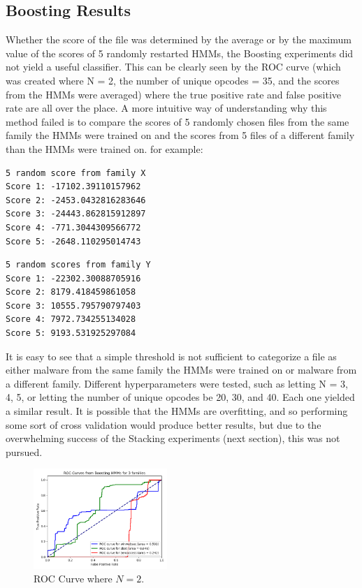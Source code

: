 \documentclass[12pt]{article}
\begin{document}
 \subsection{Boosting Results}
Whether the score of the file was determined by the average or by the maximum value of the scores of 5 randomly restarted HMMs, the Boosting experiments did not yield a useful classifier. This can be clearly seen by the ROC curve (which was created where N = 2, the number of unique opcodes = 35, and the scores from the HMMs were averaged) where the true positive rate and false positive rate are all over the place. A more intuitive way of understanding why this method failed is to compare the scores of 5 randomly chosen files from the same family the HMMs were trained on and the scores from 5 files of a different family than the HMMs were trained on. 
for example:
\begin{lstlisting}
5 random score from family X
Score 1: -17102.39110157962
Score 2: -2453.0432816283646
Score 3: -24443.862815912897
Score 4: -771.3044309566772
Score 5: -2648.110295014743
\end{lstlisting}
\begin{lstlisting}
5 random scores from family Y
Score 1: -22302.30088705916
Score 2: 8179.418459861058
Score 3: 10555.795790797403
Score 4: 7972.734255134028
Score 5: 9193.531925297084
\end{lstlisting}
It is easy to see that a simple threshold is not sufficient to categorize a file as either malware from the same family the HMMs were trained on or malware from a different family. Different hyperparameters were tested, such as letting N = 3, 4, 5, or letting the number of unique opcodes be 20, 30, and 40. Each one yielded a similar result. It is possible that the HMMs are overfitting, and so performing some sort of cross validation would produce better results, but due to the overwhelming success of the Stacking experiments (next section), this was not pursued.
\begin{figure}[H]
\centering
\includegraphics[width=0.45\textwidth]{Boosting.png}
\caption{ROC Curve where $N=2$.}
\end{figure}
\end{document}
